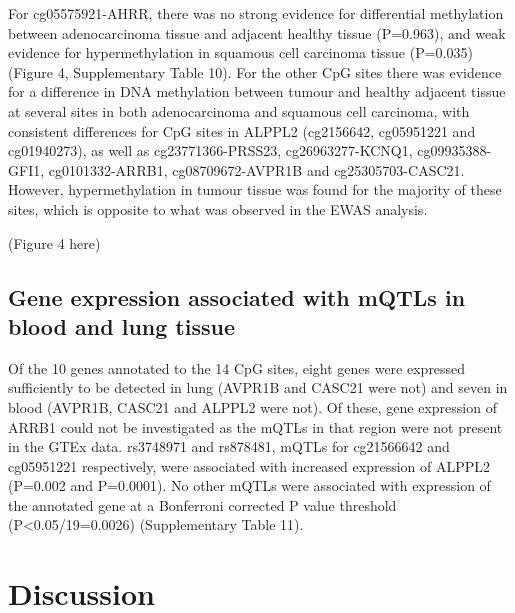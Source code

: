 \documentclass[11pt,twoside]{bristolthesis}
\begin{document}
For cg05575921-AHRR, there was no strong evidence for differential methylation between adenocarcinoma tissue and adjacent healthy tissue (P=0.963), and weak evidence for hypermethylation in squamous cell carcinoma tissue (P=0.035) (Figure 4, Supplementary Table 10). For the other CpG sites there was evidence for a difference in DNA methylation between tumour and healthy adjacent tissue at several sites in both adenocarcinoma and squamous cell carcinoma, with consistent differences for CpG sites in ALPPL2 (cg2156642, cg05951221 and cg01940273), as well as cg23771366-PRSS23, cg26963277-KCNQ1, cg09935388-GFI1, cg0101332-ARRB1, cg08709672-AVPR1B and cg25305703-CASC21. However, hypermethylation in tumour tissue was found for the majority of these sites, which is opposite to what was observed in the EWAS analysis.

(Figure 4 here)

\hypertarget{gene-expression-associated-with-mqtls-in-blood-and-lung-tissue}{%
\subsection{Gene expression associated with mQTLs in blood and lung tissue}\label{gene-expression-associated-with-mqtls-in-blood-and-lung-tissue}}

Of the 10 genes annotated to the 14 CpG sites, eight genes were expressed sufficiently to be detected in lung (AVPR1B and CASC21 were not) and seven in blood (AVPR1B, CASC21 and ALPPL2 were not). Of these, gene expression of ARRB1 could not be investigated as the mQTLs in that region were not present in the GTEx data. rs3748971 and rs878481, mQTLs for cg21566642 and cg05951221 respectively, were associated with increased expression of ALPPL2 (P=0.002 and P=0.0001). No other mQTLs were associated with expression of the annotated gene at a Bonferroni corrected P value threshold (P\textless0.05/19=0.0026) (Supplementary Table 11).

\hypertarget{discussion-1}{%
\section{Discussion}\label{discussion-1}}
\end{document}
